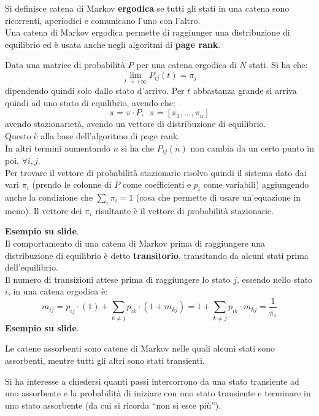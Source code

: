 \documentclass[a4paper,12pt, oneside]{book}
\begin{document}
\begin{definizione}
  Si definisce catena di Markov \textbf{ergodica} se tutti gli stati in una
  catena sono ricorrenti, aperiodici e comunicano l’uno con l’altro.\\
  Una catena di Markov ergodica permette di raggiunger una distribuzione di
  equilibrio ed è usata anche negli algoritmi di \textbf{page rank}.
\end{definizione}
\begin{teorema}
  Data una matrice di probabilità $P$ per una catena ergodica di $N$ stati. Si
  ha che:
  \[\lim_{t\to+\infty} P_{ij}(t)=\pi_j\]
  dipendendo quindi solo dallo stato d'arrivo. Per $t$ abbastanza grande si
  arriva quindi ad uno stato di equilibrio, avendo che:
  \[\pi=\pi\cdot P,\,\,\,\pi=[\pi_1,\ldots,\pi_n]\]
  avendo stazionarietà, avendo un vettore di distribuzione di equilibrio.\\
  Questo è alla base dell'algoritmo di page rank.\\
  In altri termini aumentando $n$ si ha che $P_{ij}(n)$ non cambia da un certo
  punto in poi, $\forall i,j$.\\
  Per trovare il vettore di probabilità stazionarie risolvo quindi il sistema
  dato dai vari $\pi_i$ (prendo le colonne di $P$ come coefficienti e $p_i$ come
  variabili) aggiungendo anche la condizione che $\sum_i \pi_i=1$ (cosa che
  permette di usare un'equazione in meno). Il vettore dei $\pi_i$ risultante è
  il vettore di probabilità stazionarie.
\end{teorema}
\textbf{Esempio su slide}.\\
Il comportamento di una catena di Markov prima di raggiungere una distribuzione
di equilibrio è detto \textbf{transitorio}, transitando da alcuni stati prima
dell'equilibrio. \\
Il numero di transizioni attese prima di raggiungere lo stato $j$, essendo nello
stato $i$, in una catena ergodica è:
\[m_{ij}=p_{ij}\cdot(1)+\sum_{k\neq j}p_{ik}\cdot(1+m_{kj})=1+\sum_{k\neq
    j}p_{ik}\cdot m_{kj}=\frac{1}{\pi_i}\]
\textbf{Esempio su slide}.
\begin{definizione}
  Le catene assorbenti sono catene di Markov nelle quali alcuni stati sono
  assorbenti, mentre tutti gli altri sono stati transienti.
\end{definizione}
Si ha interesse a chiedersi quanti passi intercorrono da una stato transiente
ad uno assorbente e la probabilità di iniziare con uno stato transiente e
terminare in uno stato assorbente (da cui si ricorda ``non si esce più'').
\end{document}
